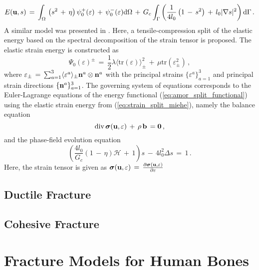 \begin{equation}
\label{eq:amor_split_functional}
E({\bf u}, s)\,=\, \int_{\Omega}\,\left(s^2\,+\,\eta\right)\psi_{0}^{+}(\varepsilon)\,+\,\psi_{0}^{-}(\varepsilon) \textrm{d}\Omega\,+\,G_{c}\int_{\Gamma} \left( \frac{1}{4 l_{0}} \left(1\,-\,s^2\right) \,+\, l_{0} |\nabla s|^2\right) \textrm{d}\Gamma\,.
\end{equation}
A similar model was presented in \cite{miehe2010thermodynamically}. Here, a tensile-compression split of the elastic energy based on the spectral decomposition of the strain tensor is proposed. The elastic strain energy is constructed as
\begin{equation}
\label{eq:strain_split_miehe}
\Psi_{0}(\varepsilon)^{\pm}\,=\, \frac{1}{2}\lambda \langle \textrm{tr}(\varepsilon)\rangle^2_{\pm}\,+\,\mu \textrm{tr}(\varepsilon^2_{\pm})\,,
\end{equation}
where $\varepsilon_{\pm}\,=\,\sum_{a=1}^{3} \langle \varepsilon^a \rangle_{\pm} {\bf n}^a \otimes {\bf n}^a$ with the principal strains $\{\varepsilon^a \}^3_{a=1}$ and principal strain directions $\{{\bf n}^a \}^3_{a=1}$. The governing system of equations corresponds to the Euler-Lagrange equations of the energy functional (\ref{eq:amor_split_functional}) using the elastic strain energy from (\ref{eq:strain_split_miehe}), namely the balance equation
\begin{equation}
\textrm{div}\,{\bm \sigma}({\bf u}, \varepsilon)\,+\, \rho\,{\bf b}\,={\bf 0}\,,
\end{equation}
and the phase-field evolution equation
\begin{equation}
\left( \frac{4 l_0 }{G_c}\left( 1\,-\,\eta \right) \mathcal{H} \,+\, 1 \right) s \,-\, 4 l_{0}^2 \Delta s \,=\,1\,.
\end{equation}
Here, the strain tensor is given as ${\bm \sigma}({\bf u}, \varepsilon)\,=\, \frac{\partial{\bm \sigma}({\bf u}, \varepsilon) }{\partial \varepsilon}$

\section{Ductile Fracture}

\section{Cohesive Fracture}
\chapter{Fracture Models for Human Bones}
